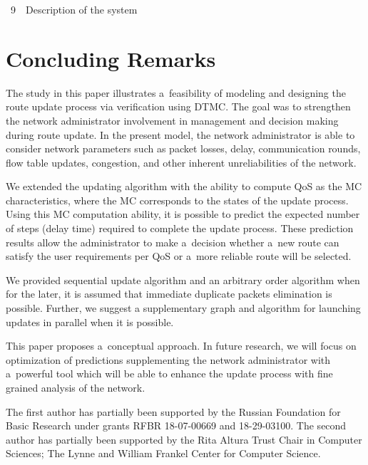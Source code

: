 \begin{multicols}{2}
{\begin{center}
\vspace*{3pt}


\noindent
{{\figurename~9}\ \ \small{Description of the system}
}
\end{center}}





\section{Concluding Remarks}

\noindent
The study in this paper illustrates a~feasibility of modeling and 
designing the route update process via verification using DTMC. The goal was to 
strengthen the network administrator involvement in management and decision 
making during route update. In the present model, the network administrator is able 
to consider network parameters such as packet losses, delay, communication 
rounds, flow table updates, congestion, and other inherent unreliabilities of 
the network. 

We extended the updating algorithm with the ability to compute QoS as the 
MC characteristics, where the MC corresponds to the states 
of the update process. Using this MC computation ability, it is 
possible to predict the expected number of steps (delay time) required to 
complete the update process. These prediction results allow the administrator 
to make a~decision whether a~new route can satisfy the user requirements per QoS 
or a~more reliable route will be selected.

We provided sequential update algorithm and an arbitrary order algorithm 
when for the later, it is assumed that immediate duplicate packets elimination 
is possible. Further, we suggest a supplementary graph and algorithm for launching 
updates in parallel when it is possible.

This paper proposes a~conceptual approach. In future research, we will focus 
on optimization of predictions supplementing the network administrator with 
a~powerful tool which will be able to enhance the update process 
with fine grained analysis of the network.

\vspace*{-12pt}


\Ack
\noindent
The first author has partially been supported by the 
Russian Foundation for Basic Research under grants RFBR 18-07-00669 and 18-29-03100. 
The second author has partially been supported by the Rita Altura Trust Chair in
Computer Sciences; The Lynne and William Frankel Center for Computer
Science.


\end{multicols}
